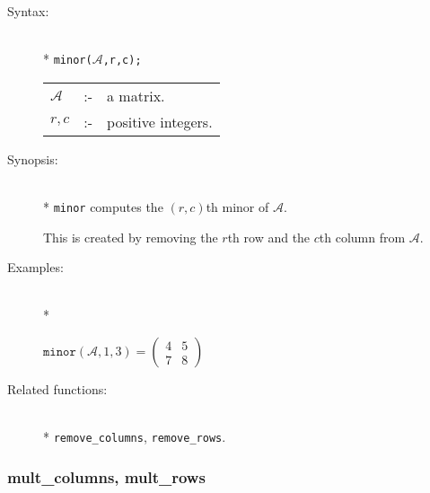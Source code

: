 \begin{description}
\item[Syntax:]\mbox{}\\*
\texttt{minor($\mathcal{A}$,r,c);}\\[2mm]
\begin{tabular}{l l l} 
$\mathcal{A}$ &:-& a matrix. \\
$r,c$        &:-& positive integers.
\end{tabular}

\item[Synopsis:]\mbox{}\\*
                \texttt{minor} computes the $(r,c)$th minor of $\mathcal{A}$.
 
                This is created by removing the $r$th row and the $c$th 
                column from $\mathcal{A}$.
                
\item[Examples:]\mbox{}\\*
\begin{flushleft}  
\begin{math}  
\texttt{minor}(\mathcal{A},1,3)  = 
        \begin{pmatrix} 4 & 5 \\ 7 & 8 \end{pmatrix}
\end{math}  
\end{flushleft}

\item[Related functions:]\mbox{}\\*
\texttt{remove\_columns}, \texttt{remove\_rows}.
\end{description}


\subsubsection{mult\_columns, mult\_rows}
\label{linalg:mult_columns}

